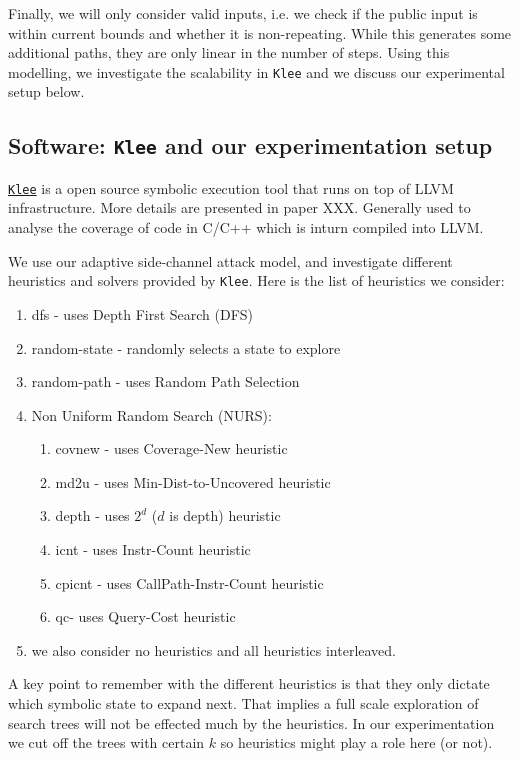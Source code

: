 \documentclass[11pt,a4paper,notitlepage]{article}
\begin{document}
Finally, we will only consider valid inputs, i.e. we check if the public input is within current bounds and whether it is non-repeating.
While this generates some additional paths, they are only linear in the number of steps.
Using this modelling, we investigate the scalability in \texttt{Klee} and we discuss our experimental setup below.

\subsection{Software: \texttt{Klee} and our experimentation setup}
\label{subsec:softwares}

\href{https://klee.github.io/}{\texttt{Klee}} is a open source symbolic execution tool that runs on top of LLVM infrastructure.
More details are presented in paper XXX.
Generally used to analyse the coverage of code in C/C++ which is inturn compiled into LLVM. 

We use our adaptive side-channel attack model, and investigate different heuristics and solvers provided by \texttt{Klee}.
Here is the list of heuristics we consider:
\begin{enumerate}
\item dfs - uses Depth First Search (DFS)
\item random-state - randomly selects a state to explore
\item random-path - uses Random Path Selection
\item Non Uniform Random Search (NURS):
  \begin{enumerate}
  \item covnew - uses Coverage-New heuristic
  \item md2u - uses Min-Dist-to-Uncovered heuristic
  \item depth - uses $2^d$ ($d$ is depth) heuristic
  \item icnt - uses Instr-Count heuristic
  \item cpicnt - uses CallPath-Instr-Count heuristic
  \item qc- uses Query-Cost heuristic
  \end{enumerate}
\item we also consider no heuristics and all heuristics interleaved.
\end{enumerate}

A key point to remember with the different heuristics is that they only dictate which symbolic state to expand next.
That implies a full scale exploration of search trees will not be effected much by the heuristics.
In our experimentation we cut off the trees with certain $k$ so heuristics might play a role here (or not).
\end{document}
